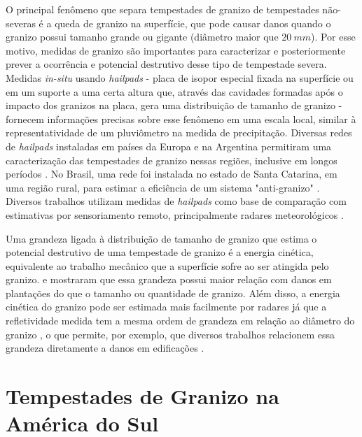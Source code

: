 O principal fenômeno que separa tempestades de granizo de tempestades não-severas é a queda de granizo na superfície, que pode causar danos quando o granizo possui tamanho grande ou gigante (diâmetro maior que $20\:mm$). Por esse motivo, medidas de granizo são importantes para caracterizar e posteriormente prever a ocorrência e potencial destrutivo desse tipo de tempestade severa. Medidas \textit{in-situ} usando \textit{hailpads} - placa de isopor especial fixada na superfície ou em um suporte a uma certa altura que, através das cavidades formadas após o impacto dos granizos na placa, gera uma distribuição de tamanho de granizo \cite{Schleusener1960a, Decker1961} - fornecem informações precisas sobre esse fenômeno em uma escala local, similar à representatividade de um pluviômetro na medida de precipitação. Diversas redes de \textit{hailpads} instaladas em países da Europa \cite{Dessens1998, Svabik1989, Giaiotti2003, Pocakal2009, Berthet2011} e na Argentina \cite{Sanchez2009} permitiram uma caracterização das tempestades de granizo nessas regiões, inclusive em longos períodos \cite{Berthet2013}. No Brasil, uma rede foi instalada no estado de Santa Catarina, em uma região rural, para estimar a eficiência de um sistema "anti-granizo" \cite{Iliine2010}. Diversos trabalhos utilizam medidas de \textit{hailpads} como base de comparação com estimativas por sensoriamento remoto, principalmente radares meteorológicos \cite{Waldvogel1978a, Schmid1992, Sanchez2013}.

Uma grandeza ligada à distribuição de tamanho de granizo que estima o potencial destrutivo de uma tempestade de granizo é a energia cinética, equivalente ao trabalho mecânico que a superfície sofre ao ser atingida pelo granizo.  e  mostraram que essa grandeza possui maior relação com danos em plantações do que o tamanho ou quantidade de granizo. Além disso, a energia cinética do granizo pode ser estimada mais facilmente por radares já que a refletividade medida tem a mesma ordem de grandeza em relação ao diâmetro do granizo \cite{Waldvogel1978a}, o que permite, por exemplo, que diversos trabalhos relacionem essa grandeza diretamente a danos em edificações \cite{Hohl2002, Schuster2006}.

\section{Tempestades de Granizo na América do Sul}

